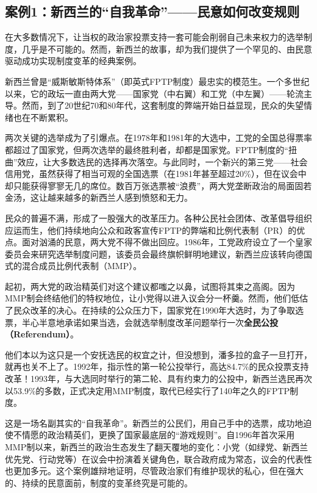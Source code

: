 \subsection{案例1：新西兰的“自我革命”——民意如何改变规则}

在大多数情况下，让当权的政治家投票支持一套可能会削弱自己未来权力的选举制度，几乎是不可能的。然而，新西兰的故事，却为我们提供了一个罕见的、由民意驱动成功实现制度变革的经典案例。

新西兰曾是“威斯敏斯特体系”（即英式FPTP制度）最忠实的模范生。一个多世纪以来，它的政坛一直由两大党——国家党（中右翼）和工党（中左翼）——轮流主导。然而，到了20世纪70和80年代，这套制度的弊端开始日益显现，民众的失望情绪也在不断累积。

两次关键的选举成为了引爆点。在1978年和1981年的大选中，工党的全国总得票率都超过了国家党，但两次选举的最终胜利者，却都是国家党。FPTP制度的“扭曲”效应，让大多数选民的选择再次落空。与此同时，一个新兴的第三党——社会信用党，虽然获得了相当可观的全国选票（在1981年甚至超过20\%），但在议会中却只能获得寥寥无几的席位。数百万张选票被“浪费”，两大党垄断政治的局面固若金汤，这让越来越多的新西兰人感到愤怒和无力。

民众的普遍不满，形成了一股强大的改革压力。各种公民社会团体、改革倡导组织应运而生，他们持续地向公众和政客宣传FPTP的弊端和比例代表制（PR）的优点。面对汹涌的民意，两大党不得不做出回应。1986年，工党政府设立了一个皇家委员会来研究选举制度问题，该委员会最终旗帜鲜明地建议，新西兰应该转向德国式的混合成员比例代表制（MMP）。

起初，两大党的政治精英们对这个建议都嗤之以鼻，试图将其束之高阁。因为MMP制会终结他们的特权地位，让小党得以进入议会分一杯羹。然而，他们低估了民众改革的决心。在持续的公众压力下，国家党在1990年大选时，为了争取选票，半心半意地承诺如果当选，会就选举制度改革问题举行一次\textbf{全民公投（Referendum）}。

他们本以为这只是一个安抚选民的权宜之计，但没想到，潘多拉的盒子一旦打开，就再也关不上了。1992年，指示性的第一轮公投举行，高达84.7\%的民众投票支持改革！1993年，与大选同时举行的第二轮、具有约束力的公投中，新西兰选民再次以53.9\%的多数，正式决定用MMP制度，取代已经实行了140年之久的FPTP制度。

这是一场名副其实的“自我革命”。新西兰的公民们，用自己手中的选票，成功地迫使不情愿的政治精英们，更换了国家最底层的“游戏规则”。自1996年首次采用MMP制以来，新西兰的政治生态发生了翻天覆地的变化：小党（如绿党、新西兰优先党、行动党等）在议会中扮演着关键角色，联合政府成为常态，议会的代表性也更加多元。这个案例雄辩地证明，尽管政治家们有维护现状的私心，但在强大的、持续的民意面前，制度的变革终究是可能的。

